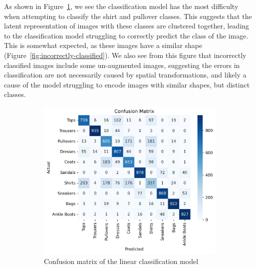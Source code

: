 \documentclass[twocolumn]{article}
\begin{document}
As shown in Figure~\ref{fig:cm}, we see the classification model has the most difficulty when attempting to classify the shirt and pullover classes. This suggests that the latent representation of images with these classes are clustered together, leading to the classification model struggling to correctly predict the class of the image. This is somewhat expected, as these images have a similar shape (Figure~\ref{fig:incorrectly-classified}). We also see from this figure that incorrectly classified images include some un-augmented images, suggesting the errors in classification are not necessarily caused by spatial transformations, and likely a cause of the model struggling to encode images with similar shapes, but distinct classes. 

\begin{figure}[h!]
    \begin{subfigure}[t]{0.45\columnwidth}
        \centering
        \includegraphics[width=\columnwidth]{../images/cvae-cm.png}
        \caption{Confusion matrix of the linear classification model}
        \label{fig:cm}
    \end{subfigure}
    \hfill
    \begin{subfigure}[t]{0.45\columnwidth}
        \centering

\end{subfigure}
\end{figure}
\end{document}
